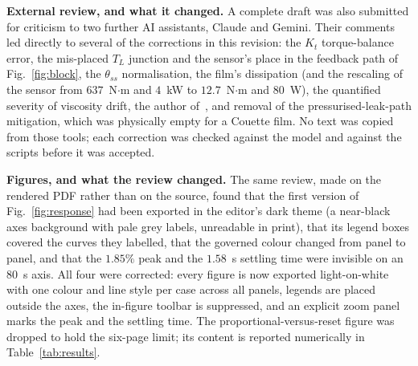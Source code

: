 \documentclass[conference]{IEEEtran}
\begin{document}
\textbf{External review, and what it changed.} A complete draft was also submitted
for criticism to two further AI assistants, Claude and Gemini. Their comments led
directly to several of the corrections in this revision: the $K_t$ torque-balance
error, the mis-placed $T_L$ junction and the sensor's place in the feedback path of
Fig.~\ref{fig:block}, the $\theta_{ss}$ normalisation, the film's dissipation (and
the rescaling of the sensor from $637$~N$\cdot$m and $4$~kW to $12.7$~N$\cdot$m and
$80$~W), the quantified severity of viscosity drift, the author of~\cite{dickinson},
and removal of the pressurised-leak-path mitigation, which was physically empty for a
Couette film. No text was copied from those tools; each correction was checked
against the model and against the scripts before it was accepted.

\textbf{Figures, and what the review changed.} The same review, made on the rendered
PDF rather than on the source, found that the first version of
Fig.~\ref{fig:response} had been exported in the editor's dark theme (a near-black
axes background with pale grey labels, unreadable in print), that its legend boxes
covered the curves they labelled, that the governed colour changed from panel to
panel, and that the $1.85\%$ peak and the $1.58$~s settling time were invisible on an
$80$~s axis. All four were corrected: every figure is now exported light-on-white
with one colour and line style per case across all panels, legends are placed outside
the axes, the in-figure toolbar is suppressed, and an explicit zoom panel marks the
peak and the settling time. The proportional-versus-reset figure was dropped to hold
the six-page limit; its content is reported numerically in Table~\ref{tab:results}.

\end{document}
